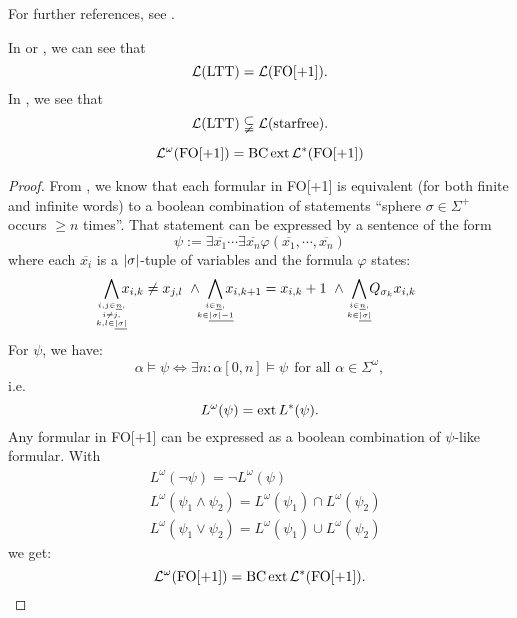 For further references, see \cite[IV.3]{FinAutLogR109}.

In \cite[IV.3.3]{FinAutLogR109} or \cite[Corollary 4.9]{LangAutLogicR102}, we can see that
\[  \mathcal{L}(\textup{\textrm{LTT}}) = \mathcal{L}(\mathrm{FO[+1]}). \]
In \cite[IV.3.4]{FinAutLogR109}, we see that
\[  \mathcal{L}(\textup{\textrm{LTT}}) \subsetneqq \mathcal{L}(\textup{\textrm{starfree}}). \]



\begin{theorem}
\[ \mathcal{L}^\omega (\mathrm{FO[+1]}) = \operatorname{BC} \operatorname{ext} \mathcal{L}^*(\mathrm{FO[+1]}) \]
\begin{proof}
From \cite[Theorem 4.8]{LangAutLogicR102}, we know that each formular in FO[+1] is equivalent (for both finite and infinite words) to a boolean combination of statements ``sphere $\sigma \in \Sigma^+$ occurs $\geq n$ times''. That statement can be expressed by a sentence of the form
\[ \psi := \exists \overline{x_1} \dotsb \exists \overline{x_n} \varphi(\overline{x_1}, \dotsb, \overline{x_n}) \]
where each $\overline{x_i}$ is a $\left| \sigma \right|$-tuple of variables and the formula $\varphi$ states:
\[
\bigwedge_{\mathclap{i,j \in \underline{n},\atop { i \neq j,\atop k,l \in \underline{\abs{\sigma}}}}} x_{i,k} \neq x_{j,l}
\ \wedge\ \bigwedge_{\mathclap{i \in \underline{n},\atop k \in \underline{\abs{\sigma}-1}}} x_{i,k+1} = x_{i,k} + 1
\ \wedge\ \bigwedge_{\mathclap{i \in \underline{n},\atop k \in \underline{\abs{\sigma}}}} Q_{\sigma_k} x_{i,k}
\]
For $\psi$, we have:
\[ \alpha \models \psi \Leftrightarrow \exists n \colon \alpha[0,n] \models \psi \ \ \text{for all } \alpha \in \Sigma^\omega , \]
i.e.
\[ L^\omega(\psi) = \operatorname{ext} L^*(\psi) . \]
Any formular in FO[+1] can be expressed as a boolean combination of $\psi$-like formular. With
\begin{align*}
& L^\omega(\neg \psi) = \neg L^\omega(\psi) \\
& L^\omega(\psi_1 \wedge \psi_2) = L^\omega(\psi_1) \cap L^\omega(\psi_2) \\
& L^\omega(\psi_1 \vee \psi_2) = L^\omega(\psi_1) \cup L^\omega(\psi_2)
\end{align*}
we get:
\[ \mathcal{L}^\omega(\mathrm{FO[+1]}) = \operatorname{BC} \operatorname{ext} \mathcal{L}^*(\mathrm{FO[+1]}). \]
\end{proof}
\end{theorem}

